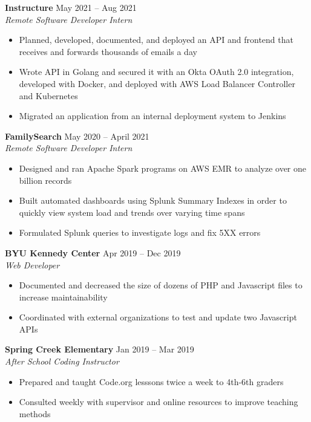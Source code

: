 \documentclass[letterpaper]{article}
\begin{document}
\textbf{Instructure} \hfill May 2021 -- Aug 2021\\
\textit{Remote Software Developer Intern}\\
\vspace{-1mm}
\begin{itemize} \itemsep 1pt
	\item Planned, developed, documented, and deployed an API and frontend that receives and forwards thousands of emails a day
	\item Wrote API in Golang and secured it with an Okta OAuth 2.0 integration, developed with Docker, and deployed with AWS Load Balancer Controller and Kubernetes
	\item Migrated an application from an internal deployment system to Jenkins
\end{itemize}
\textbf{FamilySearch} \hfill May 2020 -- April 2021\\
\textit{Remote Software Developer Intern}\\
\vspace{-1mm}
\begin{itemize} \itemsep 1pt
	\item Designed and ran Apache Spark programs on AWS EMR to analyze over one billion records
	\item Built automated dashboards using Splunk Summary Indexes in order to quickly view system load and trends over varying time spans
	\item Formulated Splunk queries to investigate logs and fix 5XX errors
    
\end{itemize}
\textbf{BYU Kennedy Center} \hfill Apr 2019 -- Dec 2019\\
\textit{Web Developer}\\
\vspace{-1mm}
\begin{itemize} \itemsep 1pt
	\item Documented and decreased the size of dozens of PHP and Javascript files to increase maintainability
	\item Coordinated with external organizations to test and update two Javascript APIs
\end{itemize}
\textbf{Spring Creek Elementary} \hfill Jan 2019 -- Mar 2019\\
\textit{After School Coding Instructor}\\
\vspace{-1mm}
\begin{itemize} \itemsep 1pt
	\item Prepared and taught Code.org lesssons twice a week to 4th-6th graders
	\item Consulted weekly with supervisor and online resources to improve teaching methods
\end{itemize}
\end{document}
